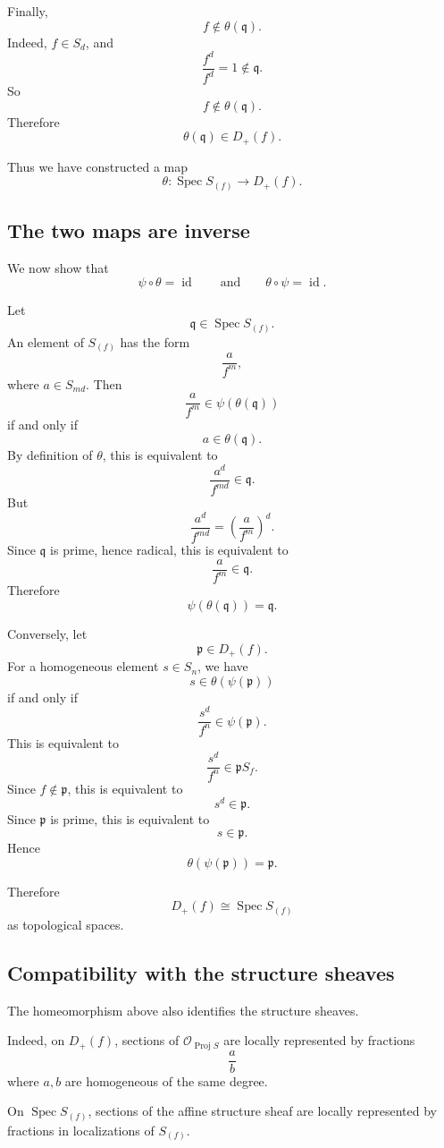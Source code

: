 \documentclass[12pt,a4paper]{article}
\DeclareMathOperator{\Spec}{Spec}
\DeclareMathOperator{\Proj}{Proj}
\theoremstyle{notespace}
\begin{document}
Finally,
\[
f\notin \theta(\mathfrak q).
\]
Indeed, \(f\in S_d\), and
\[
\frac{f^d}{f^d}=1\notin \mathfrak q.
\]
So
\[
f\notin \theta(\mathfrak q).
\]
Therefore
\[
\theta(\mathfrak q)\in D_+(f).
\]

Thus we have constructed a map
\[
\theta:\Spec S_{(f)}\longrightarrow D_+(f).
\]

\subsection{The two maps are inverse}

We now show that
\[
\psi\circ\theta=\operatorname{id}
\qquad\text{and}\qquad
\theta\circ\psi=\operatorname{id}.
\]

Let
\[
\mathfrak q\in \Spec S_{(f)}.
\]
An element of \(S_{(f)}\) has the form
\[
\frac{a}{f^m},
\]
where \(a\in S_{md}\). Then
\[
\frac{a}{f^m}\in \psi(\theta(\mathfrak q))
\]
if and only if
\[
a\in \theta(\mathfrak q).
\]
By definition of \(\theta\), this is equivalent to
\[
\frac{a^d}{f^{md}}\in \mathfrak q.
\]
But
\[
\frac{a^d}{f^{md}}
=
\left(\frac{a}{f^m}\right)^d.
\]
Since \(\mathfrak q\) is prime, hence radical, this is equivalent to
\[
\frac{a}{f^m}\in \mathfrak q.
\]
Therefore
\[
\psi(\theta(\mathfrak q))=\mathfrak q.
\]

Conversely, let
\[
\mathfrak p\in D_+(f).
\]
For a homogeneous element \(s\in S_n\), we have
\[
s\in \theta(\psi(\mathfrak p))
\]
if and only if
\[
\frac{s^d}{f^n}\in \psi(\mathfrak p).
\]
This is equivalent to
\[
\frac{s^d}{f^n}\in \mathfrak pS_f.
\]
Since \(f\notin \mathfrak p\), this is equivalent to
\[
s^d\in \mathfrak p.
\]
Since \(\mathfrak p\) is prime, this is equivalent to
\[
s\in \mathfrak p.
\]
Hence
\[
\theta(\psi(\mathfrak p))=\mathfrak p.
\]

Therefore
\[
D_+(f)\cong \Spec S_{(f)}
\]
as topological spaces.

\subsection{Compatibility with the structure sheaves}

The homeomorphism above also identifies the structure sheaves.

Indeed, on \(D_+(f)\), sections of \(\mathcal O_{\Proj S}\) are locally represented by
fractions
\[
\frac{a}{b}
\]
where \(a,b\) are homogeneous of the same degree.

On \(\Spec S_{(f)}\), sections of the affine structure sheaf are locally represented by
fractions in localizations of \(S_{(f)}\).
\end{document}
